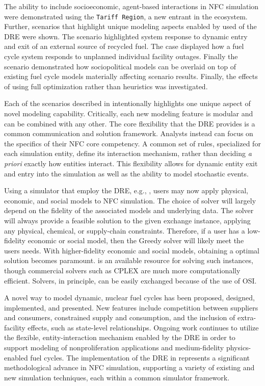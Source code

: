 The ability to include socioeconomic, agent-based interactions in NFC simulation
were demonstrated using the \texttt{Tariff Region}, a new entrant in the \Cyclus
ecosystem. Further, scenarios that highlight unique modeling aspects enabled by
used of the DRE were shown. The \external scenario highlighted system response
to dynamic entry and exit of an external source of recycled fuel. The \outage
case displayed how a fuel cycle system responds to unplanned individual facility
outages. Finally the \tariff scenario demonstrated how sociopolitical models can
be overlaid on top of existing fuel cycle models materially affecting scenario
results. Finally, the effects of using full optimization rather than heuristics
was investigated.

Each of the scenarios described in  intentionally highlights
one unique aspect of novel modeling capability. Critically, each new modeling
feature is modular and can be combined with any other. The core flexibility that
the DRE provides is a common communication and solution framework. Analysts
instead can focus on the specifics of their NFC core competency. A common set of
rules, specialized for each simulation entity, define its interaction mechanism,
rather than deciding \textit{a priori} exactly how entities interact. This
flexibility allows for dynamic entity exit and entry into the simulation as well
as the ability to model stochastic events.

Using a simulator that employ the DRE, e.g., \Cyclus, users may now apply
physical, economic, and social models to NFC simulation. The choice of solver
will largely depend on the fidelity of the associated models and underlying
data. The \greedy solver will always provide a feasible solution to the given
exchange instance, applying any physical, chemical, or supply-chain
constraints. Therefore, if a user has a low-fidelity economic or social model,
then the Greedy solver will likely meet the users needs. With higher-fidelity
economic and social models, obtaining a optimal solution becomes paramount. \cbc
is an available resource for solving such instances, though commercial solvers
such as CPLEX are much more computationally efficient. Solvers, in principle,
can be easily exchanged because of the use of OSI.

A novel way to model dynamic, nuclear fuel cycles has been proposed, designed,
implemented, and presented. New features include competition between suppliers
and consumers, constrained supply and consumption, and the inclusion of
extra-facility effects, such as state-level relationships. Ongoing work
continues to utilize the flexible, entity-interaction mechanism enabled by the
DRE in order to support modeling of nonproliferation applications and
medium-fidelity physics-enabled fuel cycles. The implementation of the DRE in
\Cyclus represents a significant methodological advance in NFC simulation,
supporting a variety of existing and new simulation techniques, each within a
common simulator framework.
